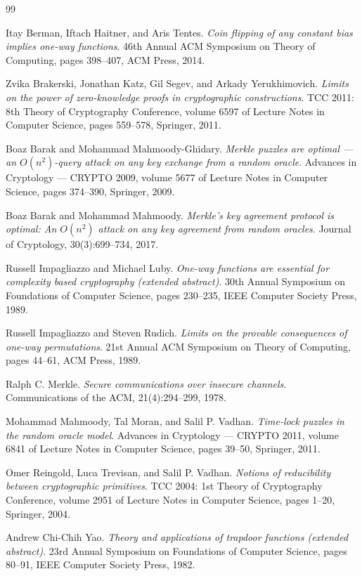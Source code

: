 \documentclass{aicr-conjecture}
\begin{document}
\begin{aicrbibliography}{99}

Itay Berman, Iftach Haitner, and Aris Tentes.
\emph{Coin flipping of any constant bias implies one-way functions}.
46th Annual ACM Symposium on Theory of Computing, pages 398--407, ACM
Press, 2014.

Zvika Brakerski, Jonathan Katz, Gil Segev, and Arkady Yerukhimovich.
\emph{Limits on the power of zero-knowledge proofs in cryptographic
constructions}.
TCC 2011: 8th Theory of Cryptography Conference, volume 6597 of Lecture
Notes in Computer Science, pages 559--578, Springer, 2011.

Boaz Barak and Mohammad Mahmoody-Ghidary.
\emph{Merkle puzzles are optimal --- an $O(n^{2})$-query attack on any
key exchange from a random oracle}.
Advances in Cryptology --- CRYPTO 2009, volume 5677 of Lecture Notes in
Computer Science, pages 374--390, Springer, 2009.

Boaz Barak and Mohammad Mahmoody.
\emph{Merkle's key agreement protocol is optimal: An $O(n^{2})$ attack on
any key agreement from random oracles}.
Journal of Cryptology, 30(3):699--734, 2017.

Russell Impagliazzo and Michael Luby.
\emph{One-way functions are essential for complexity based cryptography
(extended abstract)}.
30th Annual Symposium on Foundations of Computer Science, pages 230--235,
IEEE Computer Society Press, 1989.

Russell Impagliazzo and Steven Rudich.
\emph{Limits on the provable consequences of one-way permutations}.
21st Annual ACM Symposium on Theory of Computing, pages 44--61, ACM
Press, 1989.

Ralph C. Merkle.
\emph{Secure communications over insecure channels}.
Communications of the ACM, 21(4):294--299, 1978.

Mohammad Mahmoody, Tal Moran, and Salil P. Vadhan.
\emph{Time-lock puzzles in the random oracle model}.
Advances in Cryptology --- CRYPTO 2011, volume 6841 of Lecture Notes in
Computer Science, pages 39--50, Springer, 2011.

Omer Reingold, Luca Trevisan, and Salil P. Vadhan.
\emph{Notions of reducibility between cryptographic primitives}.
TCC 2004: 1st Theory of Cryptography Conference, volume 2951 of Lecture
Notes in Computer Science, pages 1--20, Springer, 2004.

Andrew Chi-Chih Yao.
\emph{Theory and applications of trapdoor functions (extended abstract)}.
23rd Annual Symposium on Foundations of Computer Science, pages 80--91,
IEEE Computer Society Press, 1982.

\end{aicrbibliography}
\end{document}
